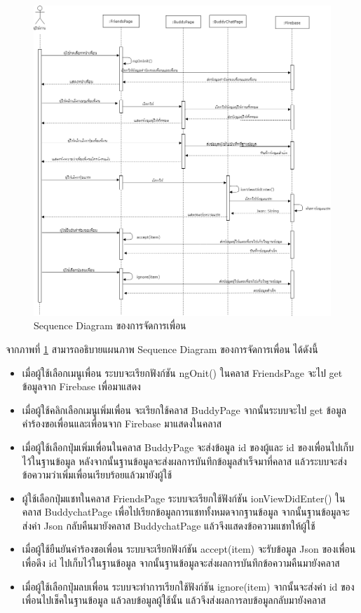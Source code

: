 \begin{figure}[H]
	\centering
	\includegraphics[width=1.1\columnwidth]
	{Figures/3/Sequence/friend}
	\caption{Sequence Diagram ของการจัดการเพื่อน}
	\label{Fig:Sequence-friend}
\end{figure}
\newpage

จากภาพที่ \ref{Fig:Sequence-friend} สามารถอธิบายแผนภาพ Sequence Diagram ของการจัดการเพื่อน ได้ดังนี้ 
\begin{itemize}
	\item เมื่อผู้ใช้เลือกเมนูเพื่อน ระบบจะเรียกฟังก์ชัน ngOnit() ในคลาส FriendsPage จะไป get ข้อมูลจาก Firebase เพื่อมาแสดง
	\item เมื่อผู้ใช้คลิกเลือกเมนูเพิ่มเพื่อน จะเรียกใช้คลาส BuddyPage จากนั้นระบบจะไป get ข้อมูลคำร้องขอเพื่อนและเพื่อนจาก Firebase มาแสดงในคลาส 
	\item เมื่อผู้ใช้เลือกปุ่มเพิ่มเพื่อนในคลาส BuddyPage จะส่งข้อมูล id ของผู้และ id ของเพื่อนไปเก็บไว้ในฐานข้อมูล หลังจากนั้นฐานข้อมูลจะส่งผลการบันทึกข้อมูลสำเร็จมาที่คลาส แล้วระบบจะส่งข้อความว่าเพิ่มเพื่อนเรียบร้อยแล้วมายังผู้ใช้
	\item ผู้ใช้เลือกปุ่มแชทในคลาส FriendsPage ระบบจะเรียกใช้ฟังก์ชัน ionViewDidEnter() ในคลาส BuddychatPage เพื่อไปเรียกข้อมูลการแชททั้งหมดจากฐานข้อมูล จากนั้นฐานข้อมูลจะส่งค่า Json กลับคืนมายังคลาส BuddychatPage แล้วจึงแสดงข้อความแชทให้ผู้ใช้
	\item เมื่อผู้ใช้ยืนยันคำร้องขอเพื่อน ระบบจะเรียกฟังก์ชัน accept(item) จะรับข้อมูล Json ของเพื่อนเพื่อดึง id ไปเก็บไว้ในฐานข้อมูล จากนั้นฐานข้อมูลจะส่งผลการบันทึกข้อความคืนมายังคลาส
	\item เมื่อผู้ใช้เลือกปุ่มลบเพื่อน ระบบจะทำการเรียกใช้ฟังก์ชัน ignore(item) จากนั้นจะส่งค่า id ของเพื่อนไปเช็คในฐานข้อมูล แล้วลบข้อมูลผู้ใช้นั้น แล้วจึงส่งผลการลบข้อมูลกลับมายังคลาส
	\end{itemize}

